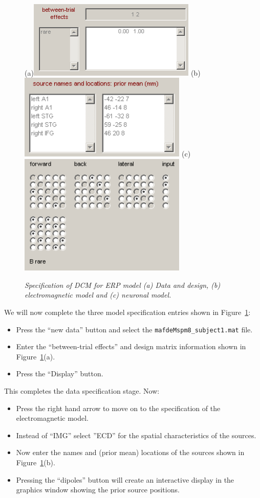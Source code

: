 \begin{figure}
\begin{center}
(a)\includegraphics[width=80mm]{mmn/data_and_design}
(b)\includegraphics[width=80mm]{mmn/electro_model}
(c)\includegraphics[width=80mm]{mmn/neuronal_model}
\caption{\em Specification of DCM for ERP model (a) Data and design, (b) electromagnetic model and (c) neuronal model.
\label{specify} }
\end{center}
\end{figure}
We will now complete the three model specification entries shown in Figure~\ref{specify}:
\begin{itemize}
\item{Press the ``new data'' button and select the \texttt{mafdeMspm8\_subject1.mat} file.}
\item{Enter the ``between-trial effects'' and design matrix information shown in Figure~\ref{specify}(a).}
\item{Press the ``Display'' button.}
\end{itemize}
This completes the data specification stage. Now:
\begin{itemize}
\item{Press the right hand arrow to move on to the specification of the electromagnetic model.}
\item{Instead of ``IMG'' select ''ECD'' for the spatial characteristics of the sources.}
\item{Now enter the names and (prior mean) locations of the sources shown in Figure~\ref{specify}(b).}
\item{Pressing the ``dipoles'' button will create an interactive display in the graphics window showing the prior source positions.}
\end{itemize}
